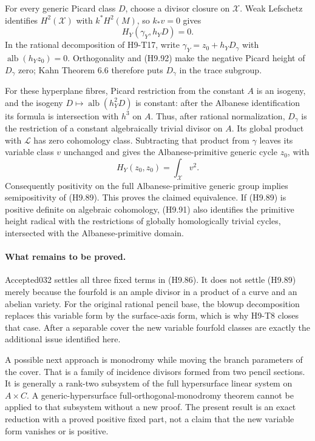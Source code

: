 \documentclass[11pt,a4paper]{article}
\begin{document}
For every generic Picard class $D$, choose a divisor closure on
$\mathcal X$. Weak Lefschetz identifies $H^2(\mathcal X)$ with
$k^*H^2(M)$, so $k_*v=0$ gives
\[
                         H_Y(\gamma_Y,h_YD)=0.              \tag{H9.92}
\]
In the rational decomposition of H9-T17, write
$\gamma_Y=z_0+h_YD_\gamma$ with
$\operatorname{alb}(h_Yz_0)=0$. Orthogonality and (H9.92) make
the negative Picard height of $D_\gamma$ zero; Kahn Theorem 6.6
therefore puts $D_\gamma$ in the trace subgroup.

For these hyperplane fibres, Picard restriction from the constant
$A$ is an isogeny, and the isogeny
$D\mapsto\operatorname{alb}(h_Y^2D)$ is constant: after the
Albanese identification its formula is intersection with $h^3$
on $A$. Thus, after rational normalization, $D_\gamma$ is the
restriction of a constant algebraically trivial divisor on $A$.
Its global product with $\mathcal L$ has zero cohomology class.
Subtracting that product from $\gamma$ leaves its variable class
$v$ unchanged and gives the Albanese-primitive generic cycle
$z_0$, with
\[
                          H_Y(z_0,z_0)=\int_{\mathcal X}v^2.
\]
Consequently positivity on the full Albanese-primitive generic
group implies semipositivity of (H9.89). This proves the claimed
equivalence. If (H9.89) is positive definite on algebraic
cohomology, (H9.91) also identifies the primitive height radical
with the restrictions of globally homologically trivial cycles,
intersected with the Albanese-primitive domain.

\paragraph{What remains to be proved.}
Accepted032 settles all three fixed terms in (H9.86). It does
not settle (H9.89) merely because the fourfold is an ample divisor
in a product of a curve and an abelian variety. For the original
rational pencil base, the blowup decomposition replaces this
variable form by the surface-axis form, which is why H9-T8 closes
that case. After a separable cover the new variable fourfold
classes are exactly the additional issue identified here.

A possible next approach is monodromy while moving the branch
parameters of the cover. That is a family of incidence divisors
formed from two pencil sections. It is generally a rank-two
subsystem of the full hypersurface linear system on $A\times C$.
A generic-hypersurface full-orthogonal-monodromy theorem cannot
be applied to that subsystem without a new proof. The present
result is an exact reduction with a proved positive fixed part,
not a claim that the new variable form vanishes or is positive.
\end{document}
